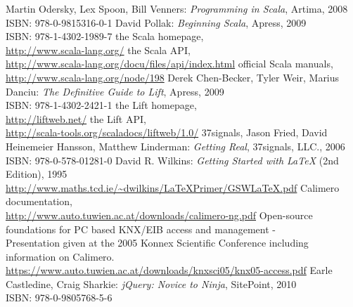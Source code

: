 	\begin{thebibliography}{999}
		 Martin Odersky, Lex Spoon, Bill Venners:
		  \emph{Programming in Scala},
		  Artima, 2008  \\
		  ISBN: 978-0-9815316-0-1
		 David Pollak:
		  \emph{Beginning Scala},
		  Apress, 2009  \\
		  ISBN: 978-1-4302-1989-7
		  the Scala homepage, \\
		  \url{http://www.scala-lang.org/}
		  the Scala API, \\
		  \url{http://www.scala-lang.org/docu/files/api/index.html}
		  official Scala manuals, \\
		  \url{http://www.scala-lang.org/node/198}
		 Derek Chen-Becker, Tyler Weir, Marius Danciu:
		  \emph{The Definitive Guide to Lift},
		  Apress, 2009  \\
		  ISBN: 978-1-4302-2421-1
		  the Lift homepage, \\
		  \url{http://liftweb.net/}
	    the Lift API, \\
	    \url{http://scala-tools.org/scaladocs/liftweb/1.0/}
	   37signals, Jason Fried, David Heinemeier Hansson, Matthew Linderman:
	    \emph{Getting Real},
		  37signals, LLC., 2006  \\
		  ISBN: 978-0-578-01281-0
		 David R. Wilkins:
		  \emph{Getting Started with LaTeX} (2nd Edition), 1995 \\
		  \url{http://www.maths.tcd.ie/~dwilkins/LaTeXPrimer/GSWLaTeX.pdf}
		  Calimero documentation, \\
		  \url{http://www.auto.tuwien.ac.at/downloads/calimero-ng.pdf}
		  Open-source foundations for PC based KNX/EIB access and management - \\
      Presentation given at the 2005 Konnex Scientific Conference including information on Calimero. \\
		  \url{https://www.auto.tuwien.ac.at/downloads/knxsci05/knx05-access.pdf}
		 Earle Castledine, Craig Sharkie:
		  \emph{jQuery: Novice to Ninja},
      SitePoint, 2010 \\
      ISBN: 978-0-9805768-5-6

\end{thebibliography}
